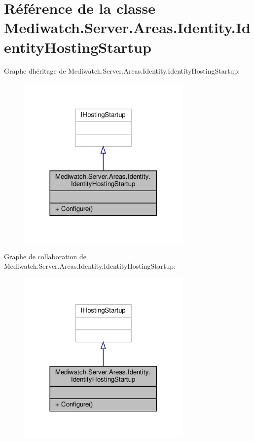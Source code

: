 \hypertarget{class_mediwatch_1_1_server_1_1_areas_1_1_identity_1_1_identity_hosting_startup}{}\section{Référence de la classe Mediwatch.\+Server.\+Areas.\+Identity.\+Identity\+Hosting\+Startup}
\label{class_mediwatch_1_1_server_1_1_areas_1_1_identity_1_1_identity_hosting_startup}


Graphe d\textquotesingle{}héritage de Mediwatch.\+Server.\+Areas.\+Identity.\+Identity\+Hosting\+Startup\+:
\nopagebreak
\begin{figure}[H]
\begin{center}
\leavevmode
\includegraphics[width=242pt]{class_mediwatch_1_1_server_1_1_areas_1_1_identity_1_1_identity_hosting_startup__inherit__graph}
\end{center}
\end{figure}


Graphe de collaboration de Mediwatch.\+Server.\+Areas.\+Identity.\+Identity\+Hosting\+Startup\+:
\nopagebreak
\begin{figure}[H]
\begin{center}
\leavevmode
\includegraphics[width=242pt]{class_mediwatch_1_1_server_1_1_areas_1_1_identity_1_1_identity_hosting_startup__coll__graph}
\end{center}
\end{figure}
